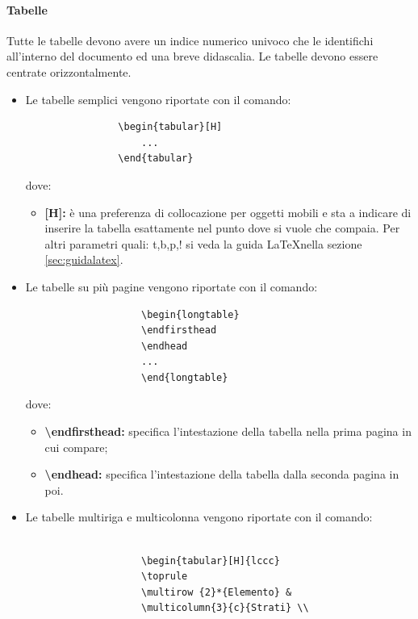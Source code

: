                 \paragraph{Tabelle}
                Tutte le tabelle devono avere un indice numerico univoco che le identifichi all'interno del documento ed una breve didascalia. Le tabelle devono essere centrate orizzontalmente.
                \begin{itemize}
				\item Le tabelle semplici vengono riportate con il comando:
				\begin{verbatim}
				\begin{tabular}[H]
					...
				\end{tabular}
				\end{verbatim}
				dove:
				\begin{itemize}
					\item \textbf{[H]:} è una preferenza di collocazione per oggetti mobili e sta a indicare di inserire la tabella esattamente nel punto dove si vuole che compaia. Per altri parametri quali: t,b,p,! si veda la guida \LaTeX nella sezione \ref{sec:guidalatex}. 
				\end{itemize} 
				\item Le tabelle su più pagine vengono riportate con il comando:
				\begin{verbatim}
					\begin{longtable}
					\endfirsthead
					\endhead
					...
					\end{longtable}
				\end{verbatim}
				dove:
				\begin{itemize}
					\item \textbf{\textbackslash endfirsthead:} specifica l'intestazione della tabella nella prima pagina in cui compare;
					\item \textbf{\textbackslash endhead:} specifica l'intestazione della tabella dalla seconda pagina in poi.
				\end{itemize} 
				\item Le tabelle multiriga e multicolonna vengono riportate con il comando: \\ \\
				\begin{minipage}{9cm}
				\begin{verbatim}
					\begin{tabular}[H]{lccc}
					\toprule
					\multirow {2}*{Elemento} & 
					\multicolumn{3}{c}{Strati} \\

\end{verbatim}
\end{minipage}
\end{itemize}
